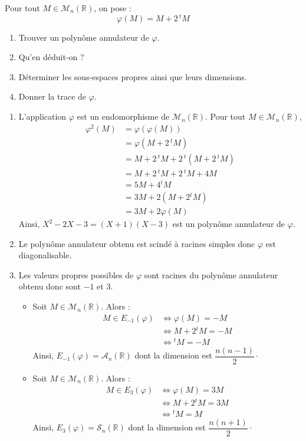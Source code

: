 \documentclass[a4paper,10pt]{report}
\begin{document}
\begin{Exa}  Pour tout $M \in \mathcal{M}_n(\mathbb{R})$, on pose :
$$ \varphi(M) = M +2 \, {}^t M$$
\begin{enumerate}
\item Trouver un polynôme annulateur de $\varphi$.
\item Qu'en déduit-on ?
\item Déterminer les sous-espaces propres ainsi que leurs dimensions.
\item Donner la trace de $\varphi$.
\end{enumerate}
\end{Exa}

\corr 

\begin{enumerate}
\item L'application $\varphi$ est un endomorphisme de $\mathcal{M}_n(\mathbb{R})$. Pour tout $M \in \mathcal{M}_n(\mathbb{R})$,
\begin{align*}
\varphi^2(M) & = \varphi(\varphi(M)) \\
& =  \varphi(M +2 \, {}^t M) \\
& = M +2 \, {}^t M +2 \, {}^t (M +2 \, {}^t M) \\
& = M +2 \, {}^t M +2 \, {}^t M +4M \\
& = 5M + 4{}^t M \\
& = 3M + 2(M +2{}^t M) \\
& = 3M + 2\varphi(M)
\end{align*}
Ainsi, $X^2-2X-3=(X+1)(X-3)$ est un polynôme annulateur de $\varphi$.
\item Le polynôme annulateur obtenu est scindé à racines simples donc $\varphi$ est diagonalisable.
\item Les valeurs propres possibles de $\varphi$ sont racines du polynôme annulateur obtenu donc sont $-1$ et $3$.
\begin{itemize}
\item Soit $M \in \mathcal{M}_n(\mathbb{R})$. Alors :
\begin{align*}
M \in E_{-1}(\varphi) & \Longleftrightarrow \varphi(M)=-M \\
& \Longleftrightarrow M +2{}^t M = -M \\
& \Longleftrightarrow {}^t M= - M 
\end{align*}
Ainsi, $E_{-1}(\varphi) = \mathcal{A}_n(\mathbb{R})$ dont la dimension est $\dfrac{n(n-1)}{2} \cdot$
\item Soit $M \in \mathcal{M}_n(\mathbb{R})$. Alors :
\begin{align*}
M \in E_{3}(\varphi) & \Longleftrightarrow \varphi(M)=3M \\
& \Longleftrightarrow M +2{}^t M = 3M \\
& \Longleftrightarrow {}^t M=  M 
\end{align*}
Ainsi, $E_{3}(\varphi) = \mathcal{S}_n(\mathbb{R})$ dont la dimension est $\dfrac{n(n+1)}{2}\cdot$
\end{itemize}


\end{enumerate}
\end{document}

